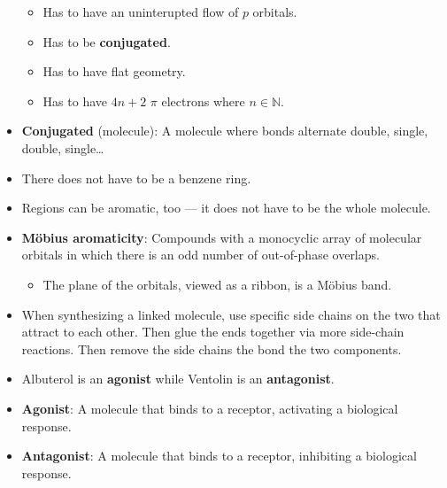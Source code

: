 \documentclass[titlepage]{article}
\numberwithin{figure}{section}
\numberwithin{table}{section}
\numberwithin{equation}{section}
\begin{document}
\begin{itemize}
\begin{itemize}
        \item Has to have an uninterupted flow of $p$ orbitals.
        \item Has to be \textbf{conjugated}.
        \item Has to have flat geometry.
        \item Has to have $4n+2$ $\pi$ electrons where $n\in\mathbb{N}$.
    \end{itemize}
    \item \textbf{Conjugated} (molecule): A molecule where bonds alternate double, single, double, single\dots
    \item There does not have to be a benzene ring.
    \item Regions can be aromatic, too --- it does not have to be the whole molecule.
    \item \textbf{M\"{o}bius aromaticity}: Compounds with a monocyclic array of molecular orbitals in which there is an odd number of out-of-phase overlaps.
    \begin{itemize}
        \item The plane of the orbitals, viewed as a ribbon, is a M\"{o}bius band.
    \end{itemize}
    \item When synthesizing a linked molecule, use specific side chains on the two that attract to each other. Then glue the ends together via more side-chain reactions. Then remove the side chains the bond the two components.
    \item Albuterol is an \textbf{agonist} while Ventolin is an \textbf{antagonist}.
    \item \textbf{Agonist}: A molecule that binds to a receptor, activating a biological response.
    \item \textbf{Antagonist}: A molecule that binds to a receptor, inhibiting a biological response.
\end{itemize}
\end{document}
